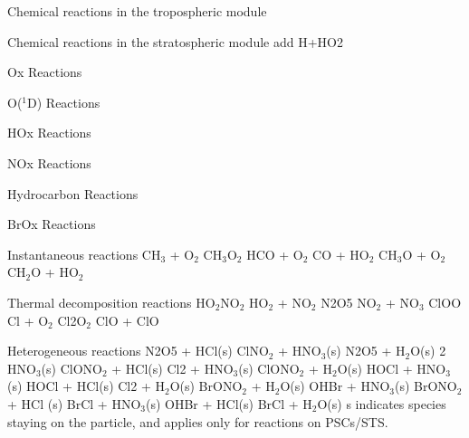 


Chemical reactions in the tropospheric module




Chemical reactions in the stratospheric module
add H+HO2

Ox Reactions

O($^1$D) Reactions

HOx Reactions

NOx Reactions

Hydrocarbon Reactions


BrOx Reactions

Instantaneous reactions
CH$_3$ + O$_2$   CH$_3$O$_2$
HCO + O$_2$   CO + HO$_2$
CH$_3$O + O$_2$   CH$_2$O + HO$_2$

Thermal decomposition reactions
HO$_2$NO$_2$   HO$_2$ + NO$_2$
N2O5   NO$_2$ + NO$_3$
ClOO   Cl + O$_2$
Cl2O$_2$   ClO + ClO

Heterogeneous reactions
N2O5 + HCl(s)   ClNO$_2$ + HNO$_3$(s)
N2O5 + H$_2$O(s)   2 HNO$_3$(s)
ClONO$_2$ + HCl(s)   Cl2 + HNO$_3$(s)
ClONO$_2$ + H$_2$O(s)   HOCl + HNO$_3$(s)
HOCl + HCl(s)   Cl2 + H$_2$O(s)
BrONO$_2$ + H$_2$O(s)   OHBr + HNO$_3$(s)
BrONO$_2$ + HCl (s)   BrCl + HNO$_3$(s)
OHBr + HCl(s)   BrCl + H$_2$O(s)
 s  indicates species staying on the particle, and applies only for reactions on PSCs/STS.
